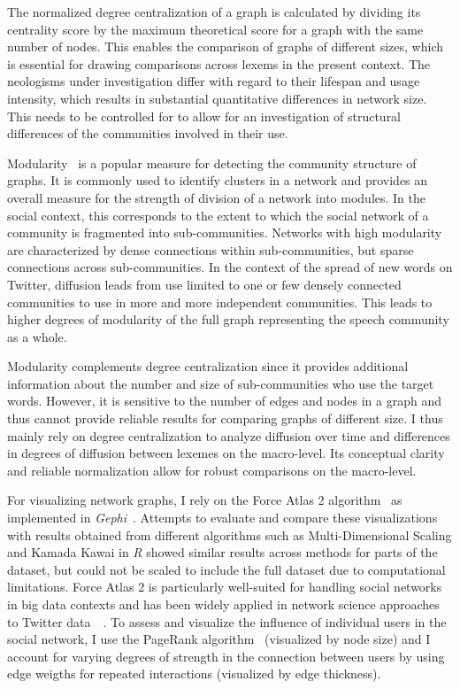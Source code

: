 \documentclass[
  a4paper,
  abstract=on,
  captions=tableabove
  ]{scrartcl}
\begin{document}
  The normalized degree centralization of a graph is calculated by dividing its centrality score by the maximum theoretical score for a graph with the same number of nodes. This enables the comparison of graphs of different sizes, which is essential for drawing comparisons across lexems in the present context. The neologisms under investigation differ with regard to their lifespan and usage intensity, which results in substantial quantitative differences in network size. This needs to be controlled for to allow for an investigation of structural differences of the communities involved in their use.

  Modularity~\parencite{Blondel2008FastUnfolding} is a popular measure for detecting the community structure of graphs. It is commonly used to identify clusters in a network and provides an overall measure for the strength of division of a network into modules. In the social context, this corresponds to the extent to which the social network of a community is fragmented into sub-communities. Networks with high modularity are characterized by dense connections within sub-communities, but sparse connections across sub-communities. In the context of the spread of new words on Twitter, diffusion leads from use limited to one or few densely connected communities to use in more and more independent communities. This leads to higher degrees of modularity of the full graph representing the speech community as a whole.

  Modularity complements degree centralization since it provides additional information about the number and size of sub-communities who use the target words. However, it is sensitive to the number of edges and nodes in a graph and thus cannot provide reliable results for comparing graphs of different size. I thus mainly rely on degree centralization to analyze diffusion over time and differences in degrees of diffusion between lexemes on the macro-level. Its conceptual clarity and reliable normalization allow for robust comparisons on the macro-level.

  For visualizing network graphs, I rely on the Force Atlas 2 algorithm~\parencite{Jacomy2014ForceAtlas2Continuous} as implemented in \emph{Gephi}~\parencite{Bastian2009GephiOpen}. Attempts to evaluate and compare these visualizations with results obtained from different algorithms such as Multi-Dimensional Scaling and Kamada Kawai in \emph{R} showed similar results across methods for parts of the dataset, but could not be scaled to include the full dataset due to computational limitations. Force Atlas 2 is particularly well-suited for handling social networks in big data contexts and has been widely applied in network science approaches to Twitter data~ \parencite{Bruns2012HowLong,Gerlitz2013MiningOne,Bliss2012TwitterReciprocal}. To assess and visualize the influence of individual users in the social network, I use the PageRank algorithm~\parencite{Brin1998AnatomyLargeScale} (visualized by node size) and I account for varying degrees of strength in the connection between users by using edge weigths for repeated interactions (visualized by edge thickness).
\end{document}
